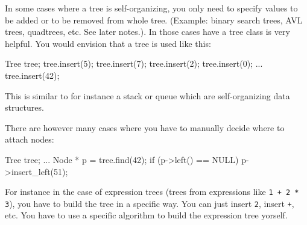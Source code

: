 In some cases where a tree is self-organizing, you only need to
specify values to be added or to be removed from whole tree.
(Example: binary search trees, AVL trees, quadtrees, etc. See later notes.).
In those cases have a tree class is very helpful.
You would envision that a tree is used like this:
\begin{console}
Tree tree;
tree.insert(5);
tree.insert(7);
tree.insert(2);
tree.insert(0);
...
tree.insert(42);
\end{console}
This is similar to for instance a stack or queue which are self-organizing data
structures.

There are however many cases where you have to manually
decide where to attach nodes:
\begin{console}
Tree tree;
...
Node * p = tree.find(42);
if (p->left() == NULL)
{
    p->insert_left(51);  
}
\end{console}
For instance in the case of expression trees (trees from
expressions like \texttt{1 + 2 * 3}),
you have to build the tree in a specific way.
You can just insert \texttt{2}, insert \texttt{+}, etc.
You have to use a specific algorithm to build the expression tree yorself.
